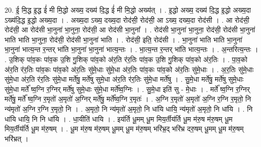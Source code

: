 \documentclass[17pt]{extarticle}
\begin{document}
20. ई॒ मि॒द्ध इ॒द्ध ई॑ मी मि॒द्धो अख्य॒ दख्य॑ दि॒द्ध ई॑ मी मि॒द्धो अख्य॑त् । . इ॒द्धो अख्य॒ दख्य॑ दि॒द्ध इ॒द्धो अख्य॒दा ऽख्य॑दि॒द्ध इ॒द्धो अख्य॒दा । . अख्य॒दा ऽख्य॒ दख्य॒दा रोद॑सी॒ रोद॑सी॒ आ ऽख्य॒ दख्य॒दा रोद॑सी । . आ रोद॑सी॒ रोद॑सी॒ आ रोद॑सी भा॒नुना॑ भा॒नुना॒ रोद॑सी॒ आ रोद॑सी भा॒नुना᳚ । . रोद॑सी भा॒नुना॑ भा॒नुना॒ रोद॑सी॒ रोद॑सी भा॒नुना॑ भाति भाति भा॒नुना॒ रोद॑सी॒ रोद॑सी भा॒नुना॑ भाति । . रोद॑सी॒ इति॒ रोद॑सी । . भा॒नुना॑ भाति भाति भा॒नुना॑ भा॒नुना॑ भात्य॒न्त र॒न्तर् भा॑ति भा॒नुना॑ भा॒नुना॑ भात्य॒न्तः । . भा॒त्य॒न्त र॒न्तर् भा॑ति भात्य॒न्तः । . अ॒न्तरित्य॒न्तः । . उ॒शिक् पा॑व॒कः पा॑व॒क उ॒शि गु॒शिक् पा॑व॒को अ॑र॒ति र॑र॒तिः पा॑व॒क उ॒शि गु॒शिक् पा॑व॒को अ॑र॒तिः । . पा॒व॒को अ॑र॒ति र॑र॒तिः पा॑व॒कः पा॑व॒को अ॑र॒तिः सु॑मे॒धाः सु॑मे॒धा अ॑र॒तिः पा॑व॒कः पा॑व॒को अ॑र॒तिः सु॑मे॒धाः । . अ॒र॒तिः सु॑मे॒धाः सु॑मे॒धा अ॑र॒ति र॑र॒तिः सु॑मे॒धा मर्ते॑षु॒ मर्ते॑षु सुमे॒धा अ॑र॒ति र॑र॒तिः सु॑मे॒धा मर्ते॑षु । . सु॒मे॒धा मर्ते॑षु॒ मर्ते॑षु सुमे॒धाः सु॑मे॒धा मर्ते᳚ ष्व॒ग्नि र॒ग्निर् मर्ते॑षु सुमे॒धाः सु॑मे॒धा मर्ते᳚ष्व॒ग्निः । . सु॒मे॒धा इति॑ सु - मे॒धाः । . मर्ते᳚ ष्व॒ग्नि र॒ग्निर् मर्ते॑षु॒ मर्ते᳚ ष्व॒ग्नि र॒मृतो॑ अ॒मृतो॑ अ॒ग्निर् मर्ते॑षु॒ मर्ते᳚ष्व॒ग्नि र॒मृतः॑ । . अ॒ग्नि र॒मृतो॑ अ॒मृतो॑ अ॒ग्नि र॒ग्नि र॒मृतो॒ नि न्य॑मृतो॑ अ॒ग्नि र॒ग्नि र॒मृतो॒ नि । . अ॒मृतो॒ नि न्य॑मृतो॑ अ॒मृतो॒ नि धा॑यि धायि॒ न्य॑मृतो॑ अ॒मृतो॒ नि धा॑यि । . नि धा॑यि धायि॒ नि नि धा॑यि । . धा॒यीति॑ धायि । . इय॑र्ति धू॒मम् धू॒म मिय॒र्तीय॑र्ति धू॒म म॑रु॒ष म॑रु॒षम् धू॒म मिय॒र्तीय॑र्ति धू॒म म॑रु॒षम् । . धू॒म म॑रु॒ष म॑रु॒षम् धू॒मम् धू॒म म॑रु॒षम् भरि॑भ्र॒द् भरि॑भ्र दरु॒षम् धू॒मम् धू॒म म॑रु॒षम् भरि॑भ्रत् । \newline
\end{document}
